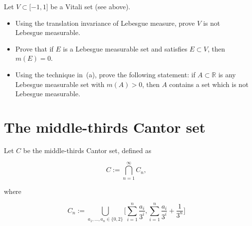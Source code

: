 \documentclass{qlnotes-export}
\begin{document}
Let \(V \subset \lbrack - 1,1\rbrack\) be a Vitali set (see above).

\begin{itemize}
\item
  Using the translation invariance of Lebesgue measure, prove \(V\) is not Lebesgue measurable.
\item
  Prove that if \(E\) is a Lebesgue measurable set and satisfies \(E \subset V\), then \(m(E) = 0\).
\item
  Using the technique in~(a), prove the following statement: if \(A \subset {\mathbb{R}}\) is any Lebesgue measurable set with \(m(A) > 0\), then \(A\) contains a set which is not Lebesgue measurable.
\end{itemize}

\section{The middle-thirds Cantor set}\label{the-middle-thirds-cantor-set}

Let \(C\) be the middle-thirds Cantor set, defined as

\[C := \bigcap\limits_{n = 1}^{\infty}C_{n},\]

where

\[C_{n} := \bigcup\limits_{a_{1},\ldots,a_{n} \in {\{{0,2}\}}}\lbrack\sum\limits_{i = 1}^{n}\frac{a_{i}}{3^{i}},\sum\limits_{i = 1}^{n}\frac{a_{i}}{3^{i}} + \frac{1}{3^{n}}\rbrack\]
\end{document}
